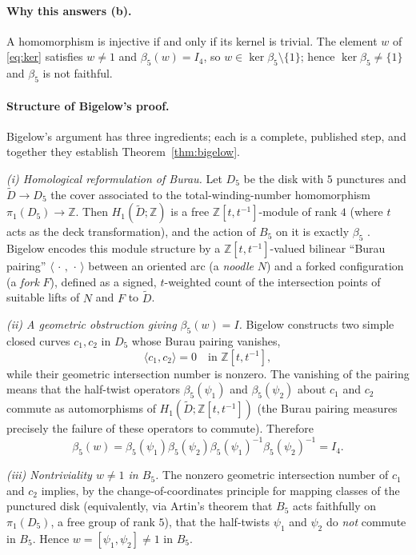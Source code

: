 \documentclass{amsart}
\theoremstyle{remark}
\begin{document}
\paragraph{Why this answers (b).}
A homomorphism is injective if and only if its kernel is trivial. The element
$w$ of \eqref{eq:ker} satisfies $w\ne1$ and $\beta_5(w)=I_4$, so
$w\in\ker\beta_5\setminus\{1\}$; hence $\ker\beta_5\ne\{1\}$ and $\beta_5$ is
not faithful.

\paragraph{Structure of Bigelow's proof.}
Bigelow's argument has three ingredients; each is a complete, published step,
and together they establish Theorem~\ref{thm:bigelow}.

\emph{(i) Homological reformulation of Burau.}
Let $D_5$ be the disk with $5$ punctures and $\widetilde D\to D_5$ the cover
associated to the total-winding-number homomorphism
$\pi_1(D_5)\to\mathbb Z$. Then $H_1(\widetilde D;\mathbb Z)$ is a free
$\mathbb Z[t,t^{-1}]$-module of rank $4$ (where $t$ acts as the deck
transformation), and the action of $B_5$ on it is exactly $\beta_5$
\cite[\S3.3]{KasselTuraev}. Bigelow encodes this module structure by a
$\mathbb Z[t,t^{-1}]$-valued bilinear ``Burau pairing''
$\langle\,\cdot\,,\,\cdot\,\rangle$ between an oriented arc (a \emph{noodle}
$N$) and a forked configuration (a \emph{fork} $F$), defined as a signed,
$t$-weighted count of the intersection points of suitable lifts of $N$ and $F$
to $\widetilde D$.

\emph{(ii) A geometric obstruction giving $\beta_5(w)=I$.}
Bigelow constructs two simple closed curves $c_1,c_2$ in $D_5$ whose Burau
pairing vanishes,
\[
\langle c_1,c_2\rangle=0 \quad\text{in }\mathbb Z[t,t^{-1}],
\]
while their geometric intersection number is nonzero. The vanishing of the
pairing means that the half-twist operators $\beta_5(\psi_1)$ and
$\beta_5(\psi_2)$ about $c_1$ and $c_2$ commute as automorphisms of
$H_1(\widetilde D;\mathbb Z[t,t^{-1}])$ (the Burau pairing measures precisely
the failure of these operators to commute). Therefore
\[
\beta_5(w)=\beta_5(\psi_1)\beta_5(\psi_2)\beta_5(\psi_1)^{-1}
\beta_5(\psi_2)^{-1}=I_4 .
\]

\emph{(iii) Nontriviality $w\ne1$ in $B_5$.}
The nonzero geometric intersection number of $c_1$ and $c_2$ implies, by the
change-of-coordinates principle for mapping classes of the punctured disk
(equivalently, via Artin's theorem that $B_5$ acts faithfully on
$\pi_1(D_5)$, a free group of rank $5$), that the half-twists $\psi_1$ and
$\psi_2$ do \emph{not} commute in $B_5$. Hence $w=[\psi_1,\psi_2]\ne1$ in
$B_5$.
\end{document}
